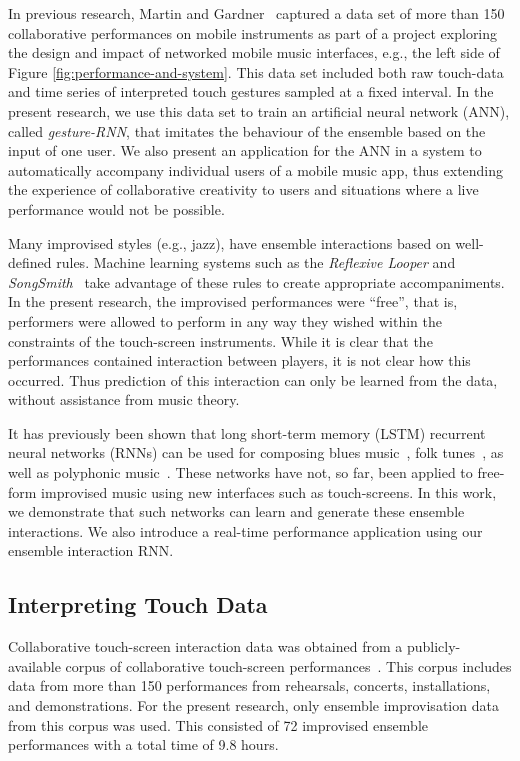 \documentclass[sigchi]{acmart} %
\begin{document}
In previous research, Martin and Gardner~\cite{Martin:2016rm} captured a
data set of more than 150 collaborative performances on mobile
instruments as part of a project exploring the design and impact of
networked mobile music interfaces, e.g., the left side of Figure
\ref{fig:performance-and-system}. This data set included both raw
touch-data and time series of interpreted touch gestures sampled at a
fixed interval. In the present research, we use this data set to train
an artificial neural network (ANN), called \emph{gesture-RNN}, that imitates the
behaviour of the ensemble based on the input of one user. We also
present an application for the ANN in a system to automatically
accompany individual users of a mobile music app, thus extending the
experience of collaborative creativity to users and situations where a
live performance would not be possible.

Many improvised styles (e.g., jazz), have ensemble interactions based
on well-defined rules. Machine learning systems such as the
\emph{Reflexive Looper}\cite{Pachet:2013kq} and
\emph{SongSmith}~\cite{Morris:2008qe} take advantage of these rules to
create appropriate accompaniments. In the present research, the
improvised performances were ``free'', that is, performers were
allowed to perform in any way they wished within the constraints of
the touch-screen instruments. While it is clear that the performances
contained interaction between players, it is not clear how this
occurred. Thus prediction of this interaction can only be learned from
the data, without assistance from music theory.

It has previously been shown that long short-term memory (LSTM)
recurrent neural networks (RNNs) can be used for composing blues
music~\cite{Eck:2007rw}, folk tunes~\cite{Sturm:2016rz}, as well as
polyphonic music~\cite{Walder:2016le}. These networks have not, so
far, been applied to free-form improvised music using new interfaces
such as touch-screens. In this work, we demonstrate that such networks
can learn and generate these ensemble interactions. We also introduce
a real-time performance application using our ensemble interaction
RNN.

\subsection{Interpreting Touch Data}

Collaborative touch-screen interaction data was obtained from a
publicly-available corpus of collaborative touch-screen
performances~\cite{Martin:2016fc}. This corpus includes data from more
than 150 performances from rehearsals, concerts, installations, and
demonstrations. For the present research, only ensemble improvisation
data from this corpus was used. This consisted of 72 improvised
ensemble performances with a total time of 9.8 hours.
\end{document}
